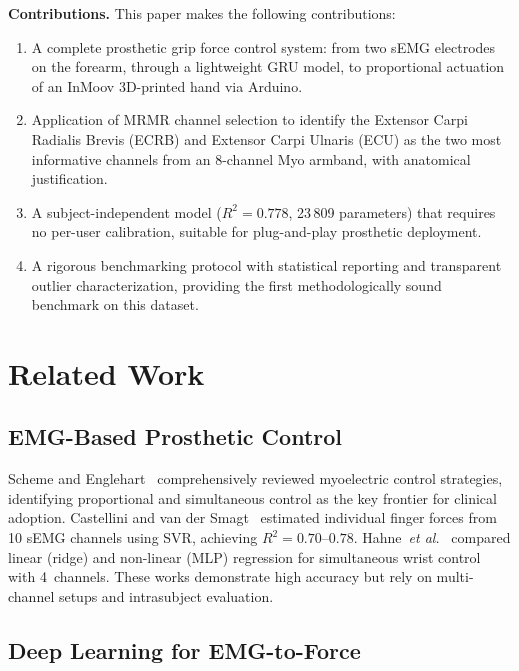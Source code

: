 \documentclass[journal]{IEEEtran}
\begin{document}
\textbf{Contributions.}  This paper makes the following contributions:
\begin{enumerate}
\item A complete prosthetic grip force control system: from two sEMG
  electrodes on the forearm, through a lightweight GRU model, to
  proportional actuation of an InMoov 3D-printed hand via Arduino.
\item Application of MRMR channel selection to identify the Extensor Carpi
  Radialis Brevis (ECRB) and Extensor Carpi Ulnaris (ECU) as the two most
  informative channels from an 8-channel Myo armband, with anatomical
  justification.
\item A subject-independent model ($R^2 = 0.778$, 23\,809 parameters) that
  requires no per-user calibration, suitable for plug-and-play prosthetic
  deployment.
\item A rigorous benchmarking protocol with statistical reporting and
  transparent outlier characterization, providing the first
  methodologically sound benchmark on this dataset.
\end{enumerate}

\section{Related Work}
\label{sec:related}

\subsection{EMG-Based Prosthetic Control}

Scheme and Englehart~\cite{scheme2011electromyogram} comprehensively
reviewed myoelectric control strategies, identifying proportional and
simultaneous control as the key frontier for clinical adoption.
Castellini and van der Smagt~\cite{castellini2009surface} estimated
individual finger forces from 10 sEMG channels using SVR, achieving
$R^2 = 0.70$--$0.78$.  Hahne~\emph{et al.}~\cite{hahne2014linear}
compared linear (ridge) and non-linear (MLP) regression for simultaneous
wrist control with 4~channels.  These works demonstrate high accuracy but
rely on multi-channel setups and intrasubject evaluation.

\subsection{Deep Learning for EMG-to-Force}
\end{document}
